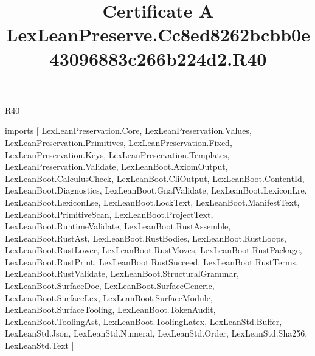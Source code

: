 \begin{lexlean}{R40}
\title{Certificate A LexLeanPreserve.Cc8ed8262bcbb0e43096883c266b224d2.R40}
\begin{coremodule}
imports [
  LexLeanPreservation.Core,
  LexLeanPreservation.Values,
  LexLeanPreservation.Primitives,
  LexLeanPreservation.Fixed,
  LexLeanPreservation.Keys,
  LexLeanPreservation.Templates,
  LexLeanPreservation.Validate,
  LexLeanBoot.AxiomOutput,
  LexLeanBoot.CalculusCheck,
  LexLeanBoot.CliOutput,
  LexLeanBoot.ContentId,
  LexLeanBoot.Diagnostics,
  LexLeanBoot.GnafValidate,
  LexLeanBoot.LexiconLre,
  LexLeanBoot.LexiconLse,
  LexLeanBoot.LockText,
  LexLeanBoot.ManifestText,
  LexLeanBoot.PrimitiveScan,
  LexLeanBoot.ProjectText,
  LexLeanBoot.RuntimeValidate,
  LexLeanBoot.RustAssemble,
  LexLeanBoot.RustAst,
  LexLeanBoot.RustBodies,
  LexLeanBoot.RustLoops,
  LexLeanBoot.RustLower,
  LexLeanBoot.RustMoves,
  LexLeanBoot.RustPackage,
  LexLeanBoot.RustPrint,
  LexLeanBoot.RustSucceed,
  LexLeanBoot.RustTerms,
  LexLeanBoot.RustValidate,
  LexLeanBoot.StructuralGrammar,
  LexLeanBoot.SurfaceDoc,
  LexLeanBoot.SurfaceGeneric,
  LexLeanBoot.SurfaceLex,
  LexLeanBoot.SurfaceModule,
  LexLeanBoot.SurfaceTooling,
  LexLeanBoot.TokenAudit,
  LexLeanBoot.ToolingAst,
  LexLeanBoot.ToolingLatex,
  LexLeanStd.Buffer,
  LexLeanStd.Json,
  LexLeanStd.Numeral,
  LexLeanStd.Order,
  LexLeanStd.Sha256,
  LexLeanStd.Text
]


\end{coremodule}
\end{lexlean}

